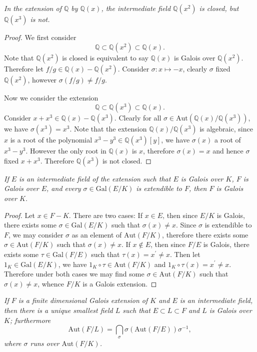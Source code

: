 \begin{problem}\em
In the extension of $\mathbb{Q}$ by $\mathbb{Q}(x)$, the intermediate field $\mathbb{Q}(x^2)$ is closed, but $\mathbb{Q}(x^3)$ is not.
\end{problem}
\begin{proof}
We first consider 
$$\mathbb{Q}\subset\mathbb{Q}(x^2)\subset\mathbb{Q}(x).$$
Note that $\mathbb{Q}(x^2)$ is closed is equivalent to say $\mathbb{Q}(x)$ is Galois over $\mathbb{Q}(x^2)$. Therefore let $f/g\in\mathbb{Q}(x)-\mathbb{Q}(x^2)$. Consider $\sigma:x\mapsto -x$, clearly $\sigma$ fixed $\mathbb{Q}(x^2)$, however $\sigma(f/g)\ne f/g$.\par
Now we consider the extension 
$$\mathbb{Q}\subset\mathbb{Q}(x^3)\subset\mathbb{Q}(x).$$
Consider $x+x^3\in\mathbb{Q}(x)-\mathbb{Q}(x^3)$. Clearly for all $\sigma\in\mathrm{Aut}(\mathbb{Q}(x)/\mathbb{Q}(x^3))$, we have $\sigma(x^3)=x^3$. Note that the extension $\mathbb{Q}(x)/\mathbb{Q}(x^3)$ is algebraic, since $x$ is a root of the polynomial $x^3-y^3\in\mathbb{Q}(x^3)[y]$, we have $\sigma(x)$ a root of $x^3-y^3$. However the only root in $\mathbb{Q}(x)$ is $x$, therefore $\sigma(x)=x$ and hence $\sigma$ fixed $x+x^3$. Therefore $\mathbb{Q}(x^3)$ is not closed.
\end{proof}
\begin{problem}\em
If $E$ is an intermediate field of the extension such that $E$ is Galois over $K$, $F$ is Galois over $E$, and every $\sigma\in \mathrm{Gal}(E/K)$ is extendible to $F$, then $F$ is Galois over $K$.
\end{problem}
\begin{proof}
Let $x\in F-K$. There are two cases: If $x\in E$, then since $E/K$ is Galois, there exists some $\sigma\in\mathrm{Gal}(E/K)$ such that $\sigma(x)\ne x$. Since $\sigma$ is extendible to $F$, we may consider $\sigma$ as an element of $\mathrm{Aut}(F/K)$, therefore there exists some $\sigma\in\mathrm{Aut}(F/K)$ such that $\sigma(x)\ne x$. If $x\notin E$, then since $F/E$ is Galois, there exists some $\tau\in\mathrm{Gal}(F/E)$ such that $\tau(x)=x^\prime\ne x$. Then let $1_K\in\mathrm{Gal}(E/K)$, we have $1_K\circ\tau\in\mathrm{Aut}(F/K)$ and $1_K\circ\tau(x)=x^\prime\ne x$. Therefore under both cases we may find some $\sigma\in\mathrm{Aut}(F/K)$ such that $\sigma(x)\ne x$, whence $F/K$ is a Galois extension.
\end{proof}
\begin{problem}\em
If $F$ is a finite dimensional Galois extension of $K$ and $E$ is an intermediate field, then there is a unique smallest field $L$ such that $E\subset L\subset F$ and $L$ is Galois over $K$; furthermore
$$\mathrm{Aut}(F/L)=\bigcap_{\sigma}\sigma(\mathrm{Aut}(F/E))\sigma^{-1},$$
where $\sigma$ runs over $\mathrm{Aut}(F/K)$.
\end{problem}
